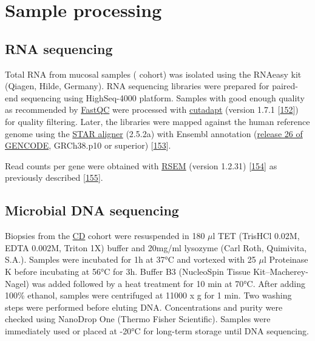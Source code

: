 \documentclass[
  12pt,
  a4paper,
  twoside,
  openright]{book}
\begin{document}
\hypertarget{processing}{%
\section{Sample processing}\label{processing}}

\hypertarget{rna-sequencing}{%
\subsection{RNA sequencing}\label{rna-sequencing}}

Total RNA from mucosal samples ( cohort) was isolated using the RNAeasy kit (Qiagen, Hilde, Germany).
RNA sequencing libraries were prepared for paired-end sequencing using HighSeq-4000 platform.
Samples with good enough quality as recommended by \href{https://www.bioinformatics.babraham.ac.uk/projects/fastqc/}{FastQC} were processed with \href{https://github.com/marcelm/cutadapt}{cutadapt} (version 1.7.1 {[}\protect\hyperlink{ref-martin2011}{152}{]}) for quality filtering.
Later, the libraries were mapped against the human reference genome using the \href{https://github.com/alexdobin/STAR}{STAR aligner} (2.5.2a) with Ensembl annotation (\href{https://www.gencodegenes.org/human/release_26.html}{release 26 of GENCODE}, GRCh38.p10 or superior) {[}\protect\hyperlink{ref-dobin2013}{153}{]}.

Read counts per gene were obtained with \href{https://github.com/deweylab/RSEM}{RSEM} (version 1.2.31) {[}\protect\hyperlink{ref-li2011}{154}{]} as previously described {[}\protect\hyperlink{ref-corralizaDifferencesPeripheralTissue}{155}{]}.

\hypertarget{microbial-dna-sequencing}{%
\subsection{Microbial DNA sequencing}\label{microbial-dna-sequencing}}

Biopsies from the \protect\hyperlink{acronyms_CD}{CD} cohort were resuspended in 180 \(\mu\)l TET (TrisHCl 0.02M, EDTA 0.002M, Triton 1X) buffer and 20mg/ml lysozyme (Carl Roth, Quimivita, S.A.). Samples were incubated for 1h at 37°C and vortexed with 25 \(\mu\)l Proteinase K before incubating at 56°C for 3h.
Buffer B3 (NucleoSpin Tissue Kit--Macherey-Nagel) was added followed by a heat treatment for 10 min at 70°C.
After adding 100\% ethanol, samples were centrifuged at 11000 x g for 1 min.
Two washing steps were performed before eluting DNA.
Concentrations and purity were checked using NanoDrop One (Thermo Fisher Scientific).
Samples were immediately used or placed at -20°C for long-term storage until DNA sequencing.
\end{document}

